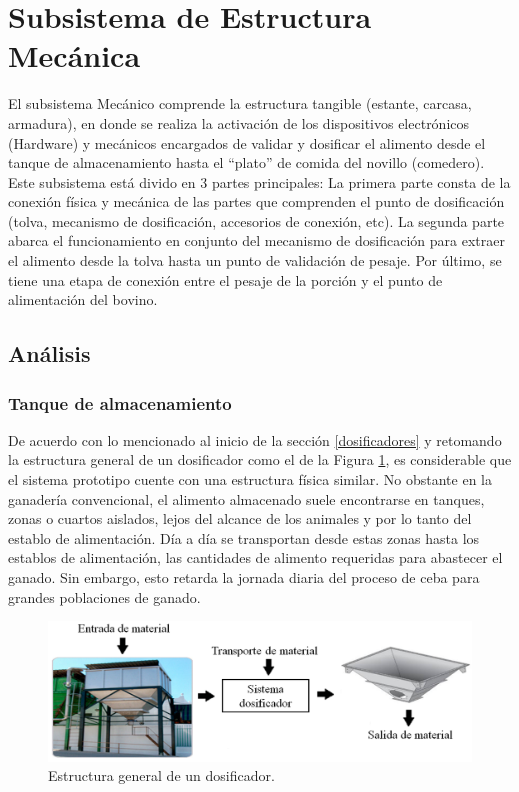 \pagebreak
\section{Subsistema  de Estructura Mecánica} \label{subsishw}

	El subsistema Mecánico comprende la estructura tangible (estante, carcasa, armadura), en donde se realiza la activación de los dispositivos electrónicos (Hardware) y mecánicos encargados de validar y dosificar el alimento desde el tanque de almacenamiento hasta el ``plato'' de comida del novillo (comedero). Este subsistema está divido en 3 partes principales: La primera parte consta de la conexión física y mecánica de las partes que comprenden el punto de dosificación (tolva, mecanismo de dosificación, accesorios de conexión, etc). La segunda parte abarca el funcionamiento en conjunto del mecanismo de dosificación para extraer el alimento desde la tolva hasta un punto de validación de pesaje. Por último, se tiene una etapa de conexión entre el pesaje de la porción y el punto de alimentación del bovino.
	
\subsection{Análisis}
\subsubsection{Tanque de almacenamiento}
    
    De acuerdo con lo mencionado al inicio de la sección \ref{dosificadores} y retomando la estructura general de un dosificador como el de la Figura \ref{dosif2png}, es considerable que el sistema prototipo cuente con una estructura física similar. No obstante en la ganadería convencional, el alimento almacenado suele encontrarse en tanques, zonas o cuartos aislados, lejos del alcance de los animales y por lo tanto del establo de alimentación. Día a día se transportan desde estas zonas hasta los establos de alimentación, las cantidades de alimento requeridas para abastecer el ganado. Sin embargo, esto retarda la jornada diaria del proceso de ceba para grandes poblaciones de ganado.
	
	\begin{figure}[H]
		\begin{center}
			\includegraphics[scale=0.55]{img/dosificacion.png}
		\end{center}
		\caption{Estructura general de un dosificador. \label{dosif2png}}
    \end{figure}
	
